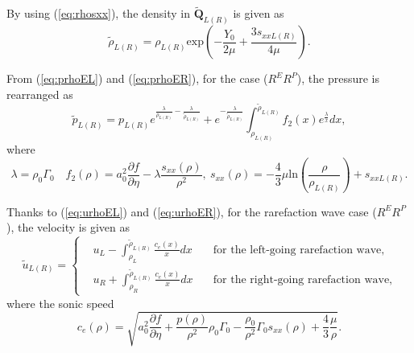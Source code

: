 \documentclass{article}
\numberwithin{equation}{section}
\numberwithin{table}{section}
\begin{document}
By using (\ref{eq:rhosxx}), the density in $\tilde{\mathbf{Q}}_{L(R)}$ is given as
\begin{equation*}
\tilde{\rho}_{L(R)} = \rho_{L(R)} \text{exp}\left(-\frac{Y_0}{2\mu}+\frac{3 s_{xxL(R)}}{4\mu}\right).
\end{equation*}

From (\ref{eq:prhoEL}) and (\ref{eq:prhoER}), for the case ($R^{E}R^{P}$), the pressure is rearranged as
\begin{equation}\label{rerpp}
  \tilde{p}_{L(R)} =
	  p_{L(R)}e^{\frac{\lambda}{\rho_{L(R)}}-\frac{\lambda}{\tilde{\rho}_{L(R)}}} +e^{-\frac{\lambda}{\tilde{\rho}_{L(R)}}}\int_{\rho_{L(R)}}^{\tilde{\rho}_{L(R)}} f_2(x) e^{\frac{\lambda}{x}}dx, %
\end{equation}
where
\begin{equation*}
  \lambda = \rho_0 \Gamma_0 \quad f_2(\rho) = a_0^2\frac{\partial f}{\partial \eta}- \lambda\frac{s_{xx}(\rho)}{\rho^2}, \ s_{xx}(\rho) =	 -\frac{4}{3}\mu\text{ln}\left(\frac{\rho}{\rho_{L(R)}}\right)+s_{xxL(R)}.
\end{equation*}


Thanks to (\ref{eq:urhoEL}) and (\ref{eq:urhoER}), for the rarefaction wave case ($R^{E}R^{P}$), the velocity is given as
\begin{equation} \label{rerpu}
  \tilde{u}_{L(R)} =\left\{ \begin{aligned}
	&u_L - \int_{\rho_L}^{\tilde{\rho}_{L(R)}} \frac{c_e(x)}{x} dx \quad  & \text{for the  left-going rarefaction wave}
 , \\
 &u_R + \int_{\rho_R}^{\tilde{\rho}_{L(R)}} \frac{c_e(x)}{x} dx \quad &  \text{for the right-going rarefaction wave} ,
	\end{aligned}
  \right. %
\end{equation}
where the sonic speed
\begin{equation*}
  c_e(\rho) =
	  \sqrt{a_0^2 \frac{\partial f}{\partial \eta} + \frac{p(\rho)}{\rho^2}\rho_0\Gamma_0 -\frac{\rho_0}{\rho^2}\Gamma_0 s_{xx}(\rho) +\frac{4}{3}\frac{\mu}{\rho}}. %
\end{equation*}

\end{document}
